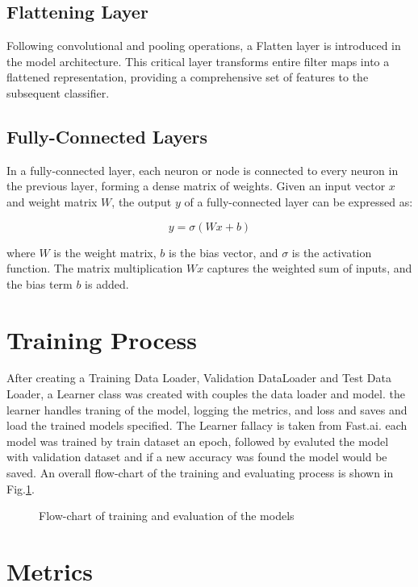 \documentclass[]{report}
\begin{document}
\subsection{Flattening Layer}
Following convolutional and pooling operations, a Flatten layer is introduced in the model architecture. This critical layer transforms entire filter maps into a flattened representation, providing a comprehensive set of features to the subsequent classifier.

\subsection{Fully-Connected Layers}
In a fully-connected layer, each neuron or node is connected to every neuron in the previous layer, forming a dense matrix of weights. Given an input vector \(x\) and weight matrix \(W\), the output \(y\) of a fully-connected layer can be expressed as:

\begin{equation}
    y = \sigma(Wx + b)
\end{equation}

where \(W\) is the weight matrix, \(b\) is the bias vector, and \(\sigma\) is the activation function. The matrix multiplication \(Wx\) captures the weighted sum of inputs, and the bias term \(b\) is added.

\section{Training Process}
After creating a Training Data Loader, Validation DataLoader and Test Data Loader, a Learner class was created with couples the data loader and model. the learner handles traning of the model, logging the metrics, and loss and saves and load the trained models specified. The Learner fallacy is taken from Fast.ai\cite{howard2018fastai}. each model was trained by train dataset an epoch, followed by evaluted the model with validation dataset and if a new accuracy was found the model would be saved. An overall flow-chart of the training and evaluating process is shown in Fig.\ref{fig:train}.

\begin{figure}
    \centering
    
    \caption{Flow-chart of training and evaluation of the models}
    \label{fig:train}
\end{figure}
\section{Metrics}
\end{document}
